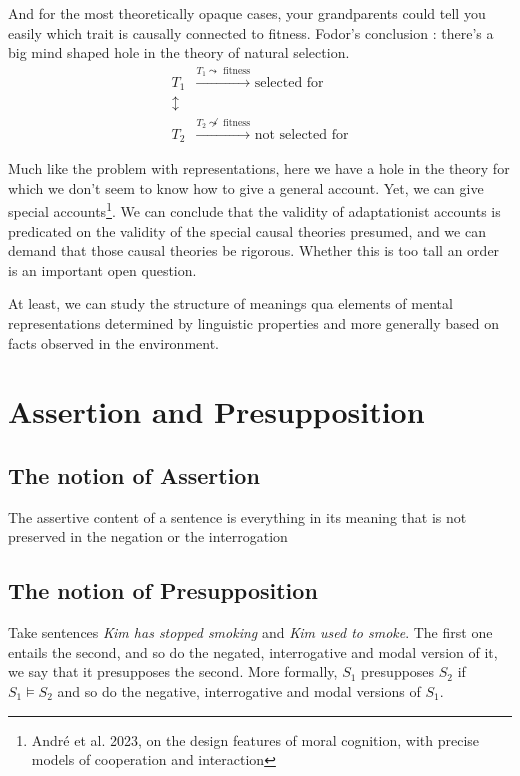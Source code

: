 \documentclass{cours}
\begin{document}
And for the most theoretically opaque cases, your grandparents could tell you easily which trait is causally connected to fitness. Fodor's conclusion : there's a big mind shaped hole in the theory of natural selection.
\[
    \begin{aligned}
        T_{1} & \xrightarrow{T_{1} \leadsto \text{ fitness}} \text{ selected for}\\
        \updownarrow & \\
        T_{2} & \xrightarrow{T_{2} \not\leadsto \text{ fitness}} \text{ not selected for}
    \end{aligned}    
\]

Much like the problem with representations, here we have a hole in the theory for which we don't seem to know how to give a general account. Yet, we can give special accounts\footnote{André et al. 2023, on the design features of moral cognition, with precise models of cooperation and interaction}. We can conclude that the validity of adaptationist accounts is predicated on the validity of the special causal theories presumed, and we can demand that those causal theories be rigorous. Whether this is too tall an order is an important open question. 

At least, we can study the structure of meanings qua elements of mental representations determined by linguistic properties and more generally based on facts observed in the environment.

\section{Assertion and Presupposition}
\subsection{The notion of Assertion}
The assertive content of a sentence is everything in its meaning that is not preserved in the negation or the interrogation

\subsection{The notion of Presupposition}
Take sentences \textsl{Kim has stopped smoking} and \textsl{Kim used to smoke}. The first one entails the second, and so do the negated, interrogative and modal version of it, we say that it presupposes the second.
More formally, $S_{1}$ presupposes $S_{2}$ if $S_{1} \vDash S_{2}$ and so do the negative, interrogative and modal versions of $S_{1}$.
\end{document}
